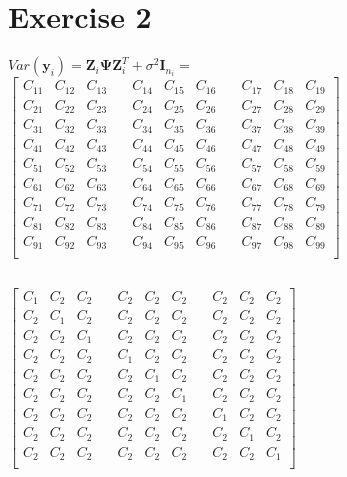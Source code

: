 \documentclass[a4paper,12pt]{article}
\begin{document}
		\section{Exercise 2}
		$Var(\mathbf{y}_i) = \mathbf{Z}_{i}\boldsymbol{\Psi}\mathbf{Z}_{i}^T + \sigma^2\mathbf{I}_{n_i} =$\\[1em]
		$\begin{bmatrix}
			C_{11} & C_{12} & C_{13} & \quad C_{14} & C_{15} & C_{16} & \quad C_{17} & C_{18} & C_{19} \\
			C_{21} & C_{22} & C_{23} & \quad C_{24} & C_{25} & C_{26} & \quad C_{27} & C_{28} & C_{29} \\
			C_{31} & C_{32} & C_{33} & \quad C_{34} & C_{35} & C_{36} & \quad C_{37} & C_{38} & C_{39} \\[1em]
			C_{41} & C_{42} & C_{43} & \quad C_{44} & C_{45} & C_{46} & \quad C_{47} & C_{48} & C_{49} \\
			C_{51} & C_{52} & C_{53} & \quad C_{54} & C_{55} & C_{56} & \quad C_{57} & C_{58} & C_{59} \\
			C_{61} & C_{62} & C_{63} & \quad C_{64} & C_{65} & C_{66} & \quad C_{67} & C_{68} & C_{69} \\[1em]
			C_{71} & C_{72} & C_{73} & \quad C_{74} & C_{75} & C_{76} & \quad C_{77} & C_{78} & C_{79} \\
			C_{81} & C_{82} & C_{83} & \quad C_{84} & C_{85} & C_{86} & \quad C_{87} & C_{88} & C_{89} \\
			C_{91} & C_{92} & C_{93} & \quad C_{94} & C_{95} & C_{96} & \quad C_{97} & C_{98} & C_{99} \\
		\end{bmatrix}$
		
		\subsection{}
		$\begin{bmatrix}
			C_{1} & C_{2} & C_{2} & \quad C_{2} & C_{2} & C_{2} & \quad C_{2} & C_{2} & C_{2} \\
			C_{2} & C_{1} & C_{2} & \quad C_{2} & C_{2} & C_{2} & \quad C_{2} & C_{2} & C_{2} \\
			C_{2} & C_{2} & C_{1} & \quad C_{2} & C_{2} & C_{2} & \quad C_{2} & C_{2} & C_{2} \\[1em]
			C_{2} & C_{2} & C_{2} & \quad C_{1} & C_{2} & C_{2} & \quad C_{2} & C_{2} & C_{2} \\
			C_{2} & C_{2} & C_{2} & \quad C_{2} & C_{1} & C_{2} & \quad C_{2} & C_{2} & C_{2} \\
			C_{2} & C_{2} & C_{2} & \quad C_{2} & C_{2} & C_{1} & \quad C_{2} & C_{2} & C_{2} \\[1em]
			C_{2} & C_{2} & C_{2} & \quad C_{2} & C_{2} & C_{2} & \quad C_{1} & C_{2} & C_{2} \\
			C_{2} & C_{2} & C_{2} & \quad C_{2} & C_{2} & C_{2} & \quad C_{2} & C_{1} & C_{2} \\
			C_{2} & C_{2} & C_{2} & \quad C_{2} & C_{2} & C_{2} & \quad C_{2} & C_{2} & C_{1} \\
		\end{bmatrix}$
		
\end{document}
